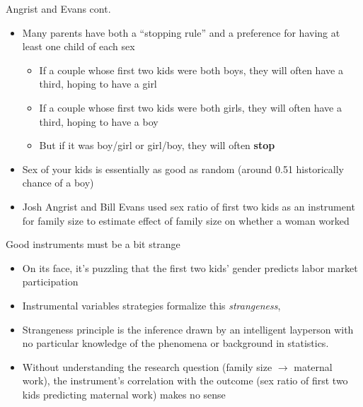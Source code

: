 \documentclass{beamer}
\begin{document}
\begin{frame}{Angrist and Evans cont.}

\begin{itemize}

		\item Many parents have both a ``stopping rule'' and a preference for having at least one child of each sex
			\begin{itemize}	
			\item If a couple whose first two kids were both boys, they will often have a third, hoping to have a girl
			\item If a couple whose first two kids were both girls, they will often have a third, hoping to have a boy
			\item But if it was boy/girl or girl/boy, they will often \textbf{stop}
			\end{itemize}
		\item Sex of your kids is essentially as good as random (around 0.51 historically chance of a boy)
		\item Josh Angrist and Bill Evans used sex ratio of first two kids as an instrument for family size to estimate effect of family size on whether a woman worked
		\end{itemize}

\end{frame}



\begin{frame}{Good instruments must be a bit strange}

\begin{itemize}
		\item On its face, it's puzzling that the first two kids' gender predicts labor market participation
		\item Instrumental variables strategies formalize this \emph{strangeness}, 
		\item Strangeness principle is the inference drawn by an intelligent layperson with no particular knowledge of the phenomena or background in statistics.
		\item Without understanding the research question (family size $\rightarrow$ maternal work), the instrument's correlation with the outcome (sex ratio of first two kids predicting maternal work) makes no sense
\end{itemize}

\end{frame}
\end{document}
